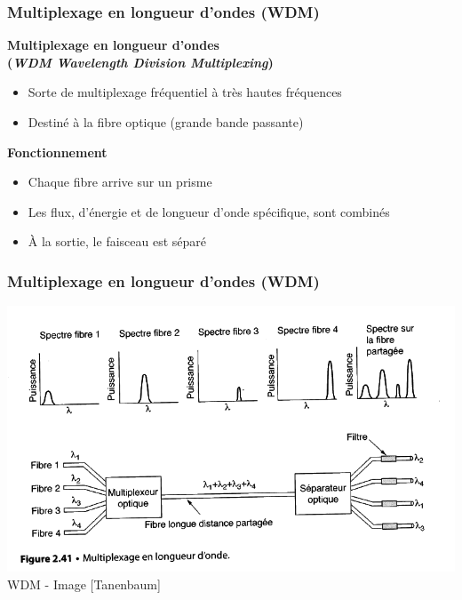 \begin{frame}[fragile]
  \frametitle{Multiplexage en longueur d'ondes (WDM)}
{\large\bf Multiplexage en longueur d'ondes  \\
(\textit{WDM Wavelength Division Multiplexing})}
\begin{itemize}
	\item Sorte de multiplexage fréquentiel à très hautes fréquences
	\item Destiné à la fibre optique (grande bande passante)
\end{itemize}
\vspace{.5cm}
\textbf{Fonctionnement}
\begin{itemize}
	\item Chaque fibre arrive sur un prisme
	\item Les flux, d'énergie et de longueur d'onde spécifique, sont combinés
	\item À la sortie, le faisceau est séparé
\end{itemize}
\end{frame}

\begin{frame}[fragile]
  \frametitle{Multiplexage en longueur d'ondes (WDM)}
\begin{center}
	\includegraphics[width=.8\linewidth]{img/2-41.png}\\
	{\scriptsize WDM - Image [Tanenbaum]}
\end{center}
\end{frame}


